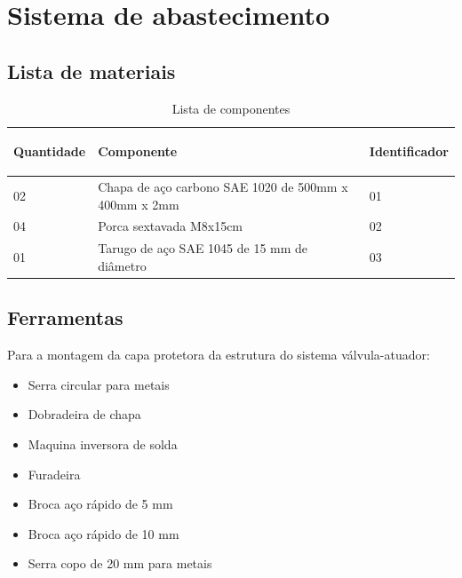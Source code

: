 \chapter{Sistema de abastecimento}

\section{Lista de materiais}
\begin{table}[H]
\centering
\begin{tabular}{|m{2.0cm} |m{9.2cm}|m{2.0cm}|}
\hline
\begin{center}Quantidade\end{center} & \begin{center}Componente\end{center} &\begin{center} Identificador\end{center} \\\hline

    02 & Chapa de aço carbono SAE 1020 de 500mm x 400mm x 2mm & 01 \\\hline
    04 & Porca sextavada M8x15cm & 02 \\\hline
    01 & Tarugo de aço SAE 1045 de 15 mm de diâmetro & 03 \\\hline
    
    
\end{tabular}
\label{table: tabelaComponentesMaletaControle}
\caption{Lista de componentes}
\end{table}

\section{Ferramentas}
    \par Para a montagem da capa protetora da estrutura do sistema válvula-atuador:
    \begin{itemize}
        \item Serra circular para metais
        \item Dobradeira de chapa
        \item Maquina inversora de solda
        \item Furadeira
        \item Broca aço rápido de 5 mm
        \item Broca aço rápido de 10 mm
        \item Serra copo de 20 mm para metais
    \end{itemize}
    
